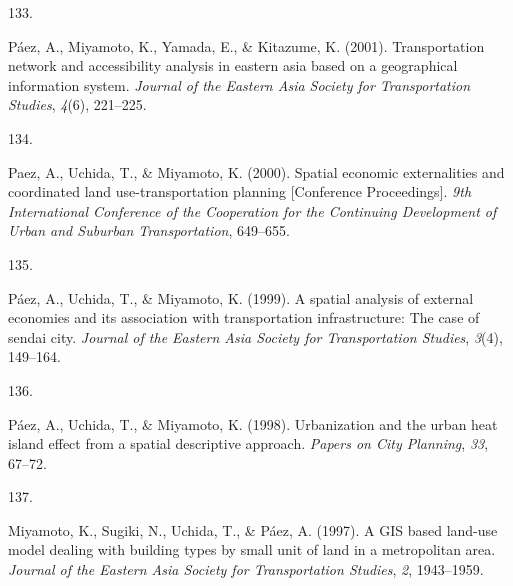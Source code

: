\documentclass[11pt,a4paper,]{awesome-cv}
\newlength{\csllabelwidth}
\newcommand{\CSLLeftMargin}[1]{\parbox[t]{\csllabelwidth}{#1}}
\newcommand{\CSLRightInline}[1]{\parbox[t]{\linewidth - \csllabelwidth}{#1}}
\begin{document}
\leavevmode{}%
\CSLLeftMargin{133. }
\CSLRightInline{Páez, A., Miyamoto, K., Yamada, E., \& Kitazume, K.
(2001). Transportation network and accessibility analysis in eastern
asia based on a geographical information system. \emph{Journal of the
Eastern Asia Society for Transportation Studies}, \emph{4}(6),
221--225.}

\leavevmode{}%
\CSLLeftMargin{134. }
\CSLRightInline{Paez, A., Uchida, T., \& Miyamoto, K. (2000). Spatial
economic externalities and coordinated land use-transportation planning
{[}Conference Proceedings{]}. \emph{9th International Conference of the
Cooperation for the Continuing Development of Urban and Suburban
Transportation}, 649--655.}

\leavevmode{}%
\CSLLeftMargin{135. }
\CSLRightInline{Páez, A., Uchida, T., \& Miyamoto, K. (1999). A spatial
analysis of external economies and its association with transportation
infrastructure: The case of sendai city. \emph{Journal of the Eastern
Asia Society for Transportation Studies}, \emph{3}(4), 149--164.}

\leavevmode{}%
\CSLLeftMargin{136. }
\CSLRightInline{Páez, A., Uchida, T., \& Miyamoto, K. (1998).
Urbanization and the urban heat island effect from a spatial descriptive
approach. \emph{Papers on City Planning}, \emph{33}, 67--72.}

\leavevmode{}%
\CSLLeftMargin{137. }
\CSLRightInline{Miyamoto, K., Sugiki, N., Uchida, T., \& Páez, A.
(1997). A GIS based land-use model dealing with building types by small
unit of land in a metropolitan area. \emph{Journal of the Eastern Asia
Society for Transportation Studies}, \emph{2}, 1943--1959.}


\label{LastPage}~
\end{document}
